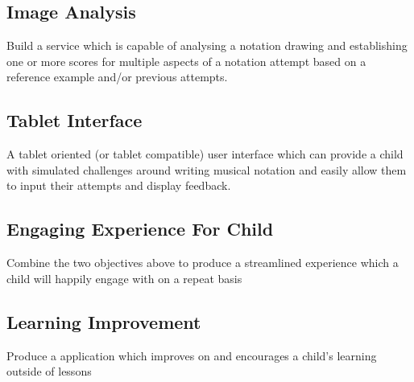 \subsection{Image Analysis}
Build a service which is capable of analysing a notation drawing and establishing one or more scores for multiple aspects of a notation attempt based on a reference example and/or previous attempts.

\subsection{Tablet Interface}
A tablet oriented (or tablet compatible) user interface which can provide a child with simulated challenges around writing musical notation and easily allow them to input their attempts and display feedback.

\subsection{Engaging Experience For Child}
Combine the two objectives above to produce a streamlined experience which a child will happily engage with on a repeat basis

\subsection{Learning Improvement}
Produce a application which improves on and encourages a child's learning outside of lessons
